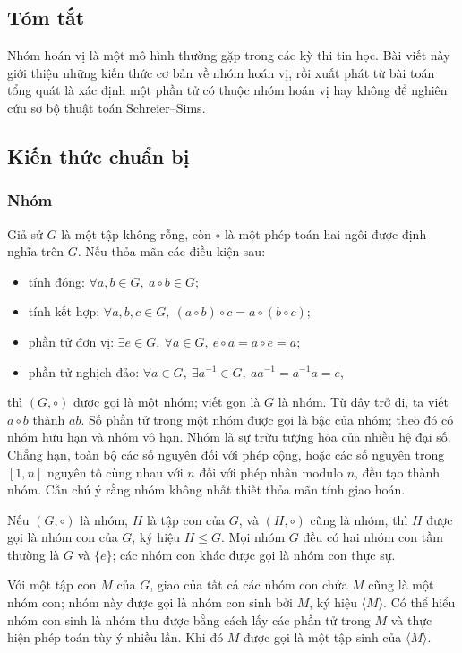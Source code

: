\documentclass[11pt]{article}
\begin{document}
\subsection*{Tóm tắt}

Nhóm hoán vị là một mô hình thường gặp trong các kỳ thi tin học. Bài viết này
giới thiệu những kiến thức cơ bản về nhóm hoán vị, rồi xuất phát từ bài toán
tổng quát là xác định một phần tử có thuộc nhóm hoán vị hay không để nghiên cứu
sơ bộ thuật toán Schreier--Sims.

\subsection{Kiến thức chuẩn bị}

\subsubsection{Nhóm}

Giả sử \(G\) là một tập không rỗng, còn \(\circ\) là một phép toán hai ngôi
được định nghĩa trên \(G\). Nếu thỏa mãn các điều kiện sau:
\begin{itemize}
  \item tính đóng: \(\forall a,b\in G,\ a\circ b\in G\);
  \item tính kết hợp: \(\forall a,b,c\in G,\ (a\circ b)\circ c
  =a\circ(b\circ c)\);
  \item phần tử đơn vị: \(\exists e\in G,\ \forall a\in G,\ e\circ a
  =a\circ e=a\);
  \item phần tử nghịch đảo: \(\forall a\in G,\ \exists a^{-1}\in G,\ aa^{-1}
  =a^{-1}a=e\),
\end{itemize}
thì \((G,\circ)\) được gọi là một nhóm; viết gọn là \(G\) là nhóm. Từ đây trở
đi, ta viết \(a\circ b\) thành \(ab\). Số phần tử trong một nhóm được gọi là bậc
của nhóm; theo đó có nhóm hữu hạn và nhóm vô hạn. Nhóm là sự trừu tượng hóa của
nhiều hệ đại số. Chẳng hạn, toàn bộ các số nguyên đối với phép cộng, hoặc các
số nguyên trong \([1,n]\) nguyên tố cùng nhau với \(n\) đối với phép nhân modulo
\(n\), đều tạo thành nhóm. Cần chú ý rằng nhóm không nhất thiết thỏa mãn tính
giao hoán.

Nếu \((G,\circ)\) là nhóm, \(H\) là tập con của \(G\), và \((H,\circ)\) cũng là
nhóm, thì \(H\) được gọi là nhóm con của \(G\), ký hiệu \(H\le G\). Mọi nhóm
\(G\) đều có hai nhóm con tầm thường là \(G\) và \(\{e\}\); các nhóm con khác
được gọi là nhóm con thực sự.

Với một tập con \(M\) của \(G\), giao của tất cả các nhóm con chứa \(M\) cũng là
một nhóm con; nhóm này được gọi là nhóm con sinh bởi \(M\), ký hiệu
\(\langle M\rangle\). Có thể hiểu nhóm con sinh là nhóm thu được bằng cách lấy
các phần tử trong \(M\) và thực hiện phép toán tùy ý nhiều lần. Khi đó \(M\)
được gọi là một tập sinh của \(\langle M\rangle\).
\end{document}
